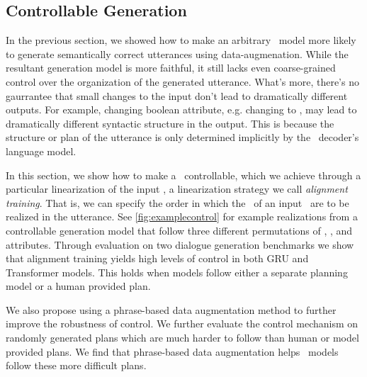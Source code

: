 \subsection{Controllable Generation}

In the previous section, we showed how to make an arbitrary \sequencetosequence~model more likely to generate semantically correct utterances using 
data-augmenation. While the resultant generation model is more faithful,
it still lacks even coarse-grained control over the organization of the 
generated utterance.  What's more, there's no gaurrantee that 
small changes to the input don't lead to dramatically different outputs.
For example, changing boolean attribute, e.g. changing
 to , may lead to dramatically
different syntactic structure in the output.
This is because the structure or plan of the utterance is only determined 
implicitly by the \sequencetosequence~decoder's language model.


In this section, we show how to make a \sequencetosequence~controllable, which
we achieve through a particular linearization of the input 
\meaningrepresentation, a linearization strategy we call \textit{alignment training}. That is, we
can specify the order in which the \attributevalues~of an input
\meaningrepresentation~are to be realized in the utterance.  See
\autoref{fig:examplecontrol} for example realizations from a controllable
generation model that follow three different permutations of ,
, and  attributes.
Through evaluation on two dialogue generation benchmarks we
show that alignment training yields high levels of control in both GRU
and Transformer models. This holds when models follow either 
a separate planning model or a human provided plan.

We also propose using a phrase-based data augmentation
method to further improve the robustness of control. We further evaluate the 
control mechanism on randomly generated plans which are much harder to follow
than human or model provided plans. We find that phrase-based data augmentation
helps \sequencetosequence~models follow these more difficult plans.


